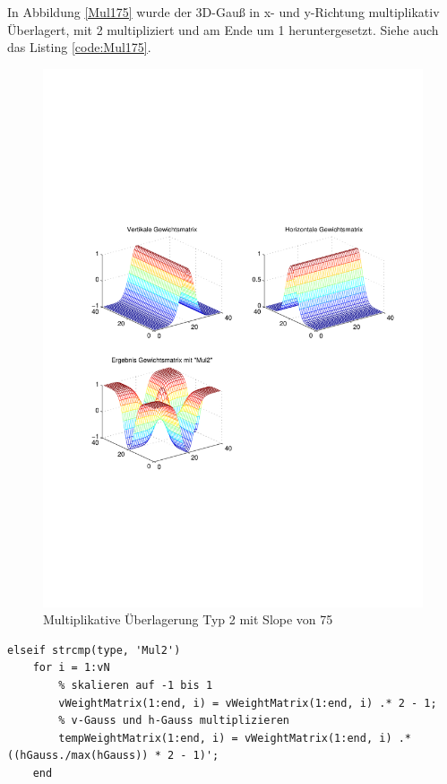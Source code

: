 In Abbildung \ref{Mul175} wurde der 3D-Gauß in x- und y-Richtung multiplikativ Überlagert, mit 2 multipliziert und am Ende um 1 heruntergesetzt. Siehe auch das Listing \ref{code:Mul175}.

\newpage
\begin{figure}[hbt]
	\centering
	\includegraphics[width=1\linewidth]{./Bilder/Auswertung/GewichtmatrixEinzelschritte/Endergebnis_Gewichtsmatrix_Slope_75_Type_Mul2}
	\caption{Multiplikative Überlagerung Typ 2 mit Slope von 75}
	\label{Mul275}
\end{figure}

\begin{lstlisting}[label=code:Mul275, caption=Auszug Matlab-Skript 'GetGaussWeights()']
elseif strcmp(type, 'Mul2')
	for i = 1:vN
		% skalieren auf -1 bis 1
		vWeightMatrix(1:end, i) = vWeightMatrix(1:end, i) .* 2 - 1;
		% v-Gauss und h-Gauss multiplizieren
		tempWeightMatrix(1:end, i) = vWeightMatrix(1:end, i) .* ((hGauss./max(hGauss)) * 2 - 1)';
	end
\end{lstlisting}

